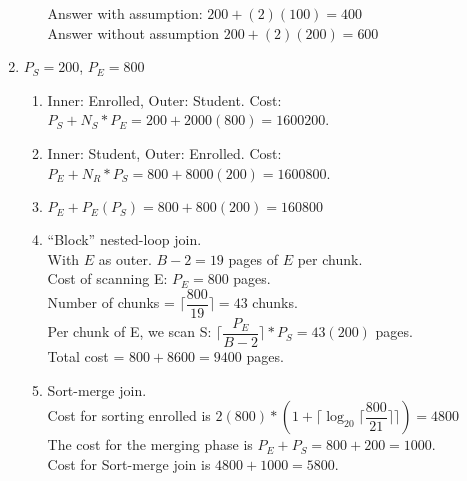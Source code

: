 \documentclass{report}
\begin{document}
\begin{enumerate}
\begin{enumerate}
			Answer with assumption: $200+ (2)(100) = 400$ \\
			Answer without assumption $200 + (2)(200) = 600$
		\end{enumerate}
		\newpage
		\item $P_S = 200$, $P_E = 800$
		\begin{enumerate}
			\item Inner: Enrolled, Outer: Student. Cost: $P_S + N_S * P_E = 200 + 2000(800) = 1600200$.
			\item Inner: Student, Outer: Enrolled. Cost: $P_E + N_R * P_S = 800 + 8000(200) = 1600800$.
			\item $P_E + P_E(P_S) = 800 + 800(200) = 160800$
			\item ``Block'' nested-loop join. \\
			With $E$ as outer. $B-2 = 19$ pages of $E$ per chunk. \\
			Cost of scanning E: $P_E = 800$ pages. \\
			Number of chunks = $\lceil \dfrac{800}{19} \rceil = 43 $ chunks. \\
			Per chunk of E, we scan S: $\lceil \dfrac{P_E}{B-2} \rceil * P_S = 43(200)$ pages.  \\
			Total cost = $800 + 8600 = 9400$ pages.
			\item Sort-merge join. \\
			Cost for sorting enrolled is $2(800) * (1 + \lceil\log_{20} \lceil \dfrac{800}{21}\rceil\rceil) = 4800$ \\
			The cost for the merging phase is $P_E + P_S = 800 + 200 = 1000$. \\
			Cost for Sort-merge join is $4800 + 1000 = 5800$.
		\end{enumerate}


\end{enumerate}
\end{document}
